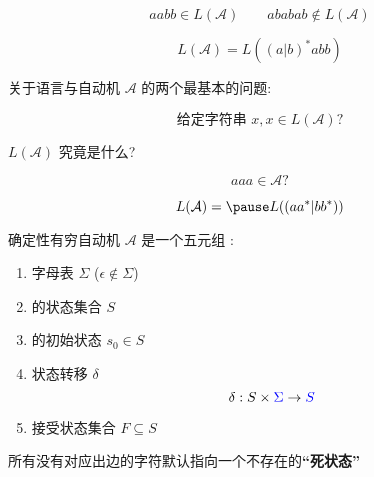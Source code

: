\begin{frame}{}

  \[
    aabb \in L(\mathcal{A}) \qquad ababab \notin L(\mathcal{A})
  \]

  \pause
  \[
    L(\mathcal{A}) = L((a|b)^{\ast}abb)
  \]
\end{frame}

\begin{frame}{}
  \begin{center}
    关于语言与自动机 $\mathcal{A}$ 的两个最基本的问题:

    \vspace{0.60cm}
    \[
      \text{给定字符串 $x$}, x \in L(\mathcal{A})?
    \]

    \vspace{0.30cm}
    $L(\mathcal{A})$ 究竟是什么?
  \end{center}
\end{frame}

\begin{frame}{}
  \[
    aaa \in \mathcal{A}?
  \]

  \[
    L(\mathcal{A}) = \pause L((aa^{\ast}|bb^{\ast}))
  \]
\end{frame}

\begin{frame}{}
  \begin{definition}
    确定性有穷自动机 $\mathcal{A}$ 是一个五元组 
    :

    \vspace{0.30cm}
    \begin{enumerate}[(1)]
      \item 字母表 $\Sigma$ ($\epsilon \notin \Sigma$)
      \item {}的状态集合 $S$
      \item {}的初始状态 $s_{0} \in S$
      \item 状态转移 $\delta$
        \[
          \delta: S \times \textcolor{blue}{\Sigma} \to \textcolor{blue}{S}
        \]
      \item 接受状态集合 $F \subseteq S$
    \end{enumerate}
  \end{definition}


  \pause
  \begin{center}
     所有没有对应出边的字符默认指向一个不存在的{\bf ``死状态''}
  \end{center}
\end{frame}

